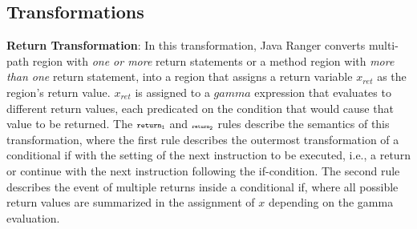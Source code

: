 \subsection{Transformations}
\label{sec:Transformations}

\textbf{Return Transformation}: In this transformation, Java Ranger converts multi-path region with \textit{one or more}
return statements or a method region with \textit{more than one} return statement, into a region that assigns a return
variable $x_{ret}$ as the region\rq s return value.
%
$x_{ret}$ is assigned to a $gamma$ expression that evaluates to different return values, each
predicated on the condition that would cause that value to be returned.
%
The $\scriptstyle\mathtt{return_1}$ and $\scriptscriptstyle\mathtt{return_2}$ rules describe the semantics of this transformation, where the first rule describes
the outermost transformation of a conditional if with the setting of the next instruction to be executed, i.e., a return
or continue with the next instruction following the if-condition. The second rule describes the event of multiple
returns inside a conditional if, where all possible return values are summarized in the assignment of $x$ depending on
the gamma evaluation.
%
%

